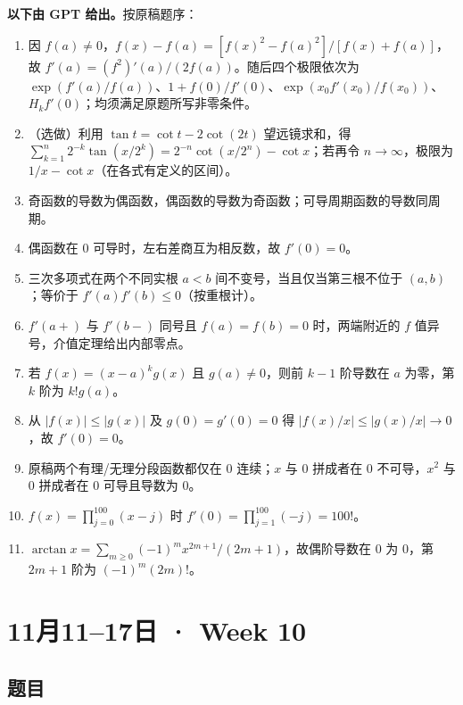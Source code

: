 \documentclass[UTF8,11pt, a4paper, oneside, fontset=none]{ctexbook}
\begin{document}
\noindent\textbf{以下由 GPT 给出。}按原稿题序：
\begin{enumerate}
\item 因 $f(a)\ne0$，$f(x)-f(a)=[f(x)^2-f(a)^2]/[f(x)+f(a)]$，故 $f'(a)=(f^2)'(a)/(2f(a))$。随后四个极限依次为 $\exp(f'(a)/f(a))$、$1+f(0)/f'(0)$、$\exp(x_0f'(x_0)/f(x_0))$、$H_k f'(0)$；均须满足原题所写非零条件。
\item（选做）利用 $\tan t=\cot t-2\cot(2t)$ 望远镜求和，得 $\sum_{k=1}^n2^{-k}\tan(x/2^k)=2^{-n}\cot(x/2^n)-\cot x$；若再令 $n\to\infty$，极限为 $1/x-\cot x$（在各式有定义的区间）。
\item 奇函数的导数为偶函数，偶函数的导数为奇函数；可导周期函数的导数同周期。
\item 偶函数在 $0$ 可导时，左右差商互为相反数，故 $f'(0)=0$。
\item 三次多项式在两个不同实根 $a<b$ 间不变号，当且仅当第三根不位于 $(a,b)$；等价于 $f'(a)f'(b)\le0$（按重根计）。
\item $f'(a+)$ 与 $f'(b-)$ 同号且 $f(a)=f(b)=0$ 时，两端附近的 $f$ 值异号，介值定理给出内部零点。
\item 若 $f(x)=(x-a)^k g(x)$ 且 $g(a)\ne0$，则前 $k-1$ 阶导数在 $a$ 为零，第 $k$ 阶为 $k!g(a)$。
\item 从 $|f(x)|\le |g(x)|$ 及 $g(0)=g'(0)=0$ 得 $|f(x)/x|\le|g(x)/x|\to0$，故 $f'(0)=0$。
\item 原稿两个有理/无理分段函数都仅在 $0$ 连续；$x$ 与 $0$ 拼成者在 $0$ 不可导，$x^2$ 与 $0$ 拼成者在 $0$ 可导且导数为 $0$。
\item $f(x)=\prod_{j=0}^{100}(x-j)$ 时 $f'(0)=\prod_{j=1}^{100}(-j)=100!$。
\item $\arctan x=\sum_{m\ge0}(-1)^m x^{2m+1}/(2m+1)$，故偶阶导数在 $0$ 为 $0$，第 $2m+1$ 阶为 $(-1)^m(2m)!$。
\end{enumerate}

\clearpage

\section{11月11--17日 · Week 10}

\subsection*{题目}
\end{document}
